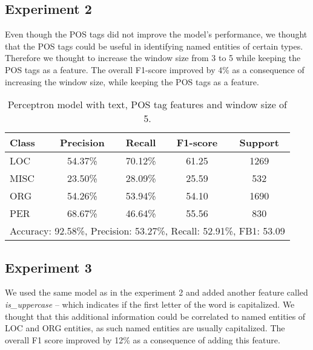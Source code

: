 \documentclass[12pt]{report}
\begin{document}
\subsection*{Experiment 2}

Even though the POS tags did not improve the model's performance, we thought that the POS tags could be useful in identifying named entities of certain types. Therefore we thought to increase the window size from 3 to 5 while keeping the POS tags as a feature. The overall F1-score improved by 4\% as a consequence of increasing the window size, while keeping the POS tags as a feature.

\begin{table}[h]
	\centering
	\label{tab:exp2}
	\begin{tabular}{lcccc}
		\hline
		\textbf{Class} & \textbf{Precision} & \textbf{Recall} & \textbf{F1-score} & \textbf{Support} \\ \hline
		LOC            & 54.37\%            & 70.12\%         & 61.25             & 1269             \\ \hline
		MISC           & 23.50\%            & 28.09\%         & 25.59             & 532              \\ \hline
		ORG            & 54.26\%            & 53.94\%         & 54.10             & 1690             \\ \hline
		PER            & 68.67\%            & 46.64\%         & 55.56             & 830              \\ \hline
		\hline
		\multicolumn{5}{c}{Accuracy: 92.58\%, Precision: 53.27\%, Recall: 52.91\%, FB1: 53.09}       \\ \hline
	\end{tabular}
	\caption{Perceptron model with text, POS tag features and window size of 5.}
\end{table}


\subsection*{Experiment 3}

We used the same model as in the experiment 2 and added another feature called \textit{is\_uppercase} – which indicates if the first letter of the word is capitalized. We thought that this additional information could be correlated to named entities of LOC and ORG entities, as such named entities are usually capitalized. The overall F1 score improved by 12\% as a consequence of adding this feature.
\end{document}
